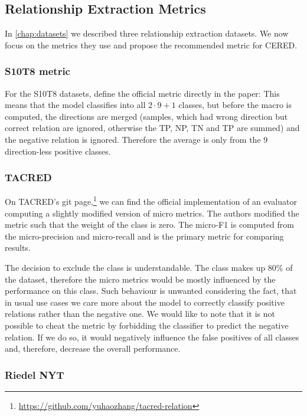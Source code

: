 \subsection{Relationship Extraction Metrics}

In \autoref{chap:datasets} we described three relationship extraction datasets. We now focus on the metrics they use and propose the recommended metric for CERED.

\subsubsection{S10T8 metric}
For the S10T8 datasets, \cite{semeval} define the official metric directly in the paper:  This means that the model classifies into all $2 \cdot 9+1$ classes, but before the macro is computed, the directions are merged (samples, which had wrong direction but correct relation are ignored, otherwise the TP, NP, TN and TP are summed) and the negative relation is ignored. Therefore the average is only from the 9 direction-less positive classes. 

\subsubsection{TACRED}
On TACRED's git page,\footnote{\url{https://github.com/yuhaozhang/tacred-relation}} we can find the official implementation of an evaluator computing a slightly modified version of micro metrics. The authors modified the metric such that the weight of the  class is zero. The micro-F1 is computed from the micro-precision and micro-recall and is the primary metric for comparing results.

The decision to exclude the  class is understandable. The class makes up 80\% of the dataset, therefore the micro metrics would be mostly influenced by the performance on this class. Such behaviour is unwanted considering the fact, that in usual use cases we care more about the model to correctly classify positive relations rather than the negative one. We would like to note that it is not possible to cheat the metric by forbidding the classifier to predict the negative relation. If we do so, it would negatively influence the false positives of all classes and, therefore, decrease the overall performance.


\subsubsection{Riedel NYT}

